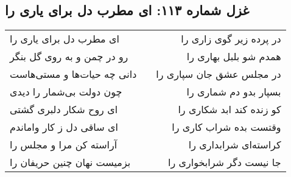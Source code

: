\begin{center}
\section*{غزل شماره ۱۱۳: ای مطرب دل برای یاری را}
\label{sec:0113}
\begin{longtable}{l p{0.5cm} r}
ای مطرب دل برای یاری را
&&
در پرده زیر گوی زاری را
\\
رو در چمن و به روی گل بنگر
&&
همدم شو بلبل بهاری را
\\
دانی چه حیات‌ها و مستی‌هاست
&&
در مجلس عشق جان سپاری را
\\
چون دولت بی‌شمار را دیدی
&&
بسپار بدو دم شماری را
\\
ای روح شکار دلبری گشتی
&&
کو زنده کند ابد شکاری را
\\
ای ساقی دل ز کار واماندم
&&
وقتست بده شراب کاری را
\\
آراسته کن مرا و مجلس را
&&
کراسته‌ای شرابداری را
\\
بزمیست نهان چنین حریفان را
&&
جا نیست دگر شرابخواری را
\\
\end{longtable}
\end{center}
